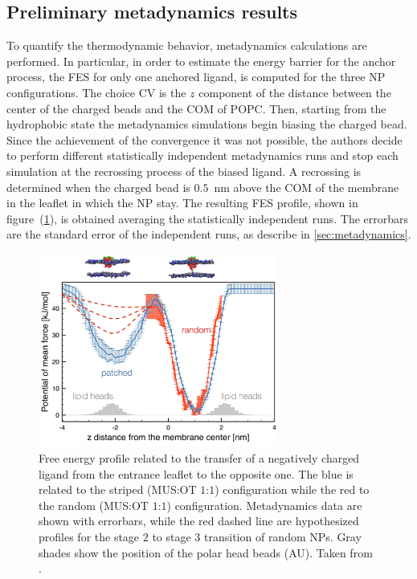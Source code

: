 \subsection{Preliminary metadynamics results}
To quantify the thermodynamic behavior, metadynamics calculations are performed. In particular, in order to estimate the energy barrier for the anchor process, the \ac{FES} for only one anchored ligand, is computed for the three \ac{NP} configurations. The choice \ac{CV} is the $z$ component of the distance between the center of the charged beads and the \ac{COM} of \ac{POPC}. Then, starting from the hydrophobic state the metadynamics simulations begin biasing the charged bead. Since the achievement of the convergence it was not possible, the authors decide to perform different statistically independent metadynamics runs and stop each simulation at the recrossing process of the biased ligand. A recrossing is determined when the charged bead is $0.5$~nm above the \ac{COM} of the membrane in the leaflet in which the \ac{NP} stay. The resulting \ac{FES} profile, shown in figure~(\ref{fig:NPFES}), is obtained averaging the statistically independent runs. The errorbars are the standard error of the independent runs, as describe in \ref{sec:metadynamics}.
\begin{figure}[h!t]
	\centering
	\includegraphics[width=0.7\textwidth]{./img/NPFES}
	\caption{Free energy profile related to the transfer of a negatively charged ligand from the entrance leaflet to the opposite one. The blue is related to the striped (\ac{MUS}:\ac{OT} $1$:$1$) configuration while the red to the random (\ac{MUS}:\ac{OT} $1$:$1$) configuration. Metadynamics data are shown with errorbars, while the red dashed line are hypothesized profiles for the stage $2$ to stage $3$ transition of random \acp{NP}. Gray shades show the position of the polar head beads (AU). Taken from \cite{ourPaper}.}
	\label{fig:NPFES}
\end{figure}

